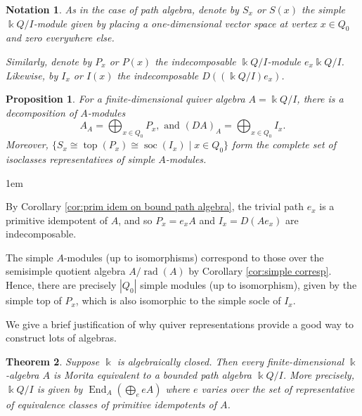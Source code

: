 \documentclass[11pt,a4paper]{article}
\makeatletter
\numberwithin{equation}{section}
\renewenvironment{proof}[1][\proofname]{\par
    \pushQED{\qed}%
    \normalfont \topsep0\p@\@plus6\p@ \labelsep1em\relax
    \trivlist
    \item[\hskip\labelsep\indent
        \bfseries #1]\ignorespaces
    \mbox{}
}{
    \popQED\endtrivlist\@endpefalse
}
\theoremstyle{all}
\newtheorem{theorem}{Theorem}[section]
\newtheorem{proposition}[theorem]{Proposition}
\newtheorem*{notation}{Notation}
\theoremstyle{remark}
\newcommand{\soc}{\operatorname{soc}\nolimits}
\newcommand{\rad}{\operatorname{rad}\nolimits}
\renewcommand{\top}{\operatorname{top}\nolimits}
\newcommand{\End}{\operatorname{End}\nolimits}
\newcommand{\defn}[1]{\textsl{\color{darkblue} #1}}
\makeatother
\begin{document}
\begin{notation}
As in the case of path algebra, denote by $S_x$ or $S(x)$ the simple $\Bbbk Q/I$-module given by placing a one-dimensional vector space at vertex $x\in Q_0$ and zero everywhere else.

Similarly, denote by $P_x$ or $P(x)$ the indecomposable $\Bbbk Q/I$-module $e_x \Bbbk Q/I$.
Likewise, by $I_x$ or $I(x)$ the indecomposable $D((\Bbbk Q/I) e_x)$.
\end{notation}

\begin{proposition}
For a finite-dimensional quiver algebra $A=\Bbbk Q/I$, there is a decomposition of $A$-modules
\[
A_A = \bigoplus_{x\in Q_0} P_x, \text{ and } (DA)_A = \bigoplus_{x\in Q_0} I_x.
\]
Moreover, $\{ S_x\cong \top(P_x) \cong \soc(I_x)\mid x\in Q_0\}$ form the complete set of isoclasses representatives of simple $A$-modules.
\end{proposition}
\begin{proof}
By Corollary \ref{cor:prim idem on bound path algebra}, the trivial path $e_x$ is a primitive idempotent of $A$, and so $P_x = e_x A$ and $I_x=D(A e_x)$ are indecomposable.

The simple $A$-modules (up to isomorphisms) correspond to those over the semisimple quotient algebra $A/\rad(A)$ by Corollary \ref{cor:simple corresp}.  Hence, there are precisely $|Q_0|$ simple modules (up to isomorphism), given by the simple top of $P_x$, which is also isomorphic to the simple socle of $I_x$.
\end{proof}

We give a brief justification of why quiver representations provide a good way to construct lots of algebras.

\begin{theorem}
Suppose $\Bbbk$ is algebraically closed.
Then every finite-dimensional $\Bbbk$-algebra $A$ is \defn{Morita equivalent} to a bounded path algebra $\Bbbk Q/I$.
More precisely, $\Bbbk Q/I$ is given by $\End_A(\bigoplus_{e} eA)$ where $e$ varies over the set of representative of equivalence classes of primitive idempotents of $A$.
\end{theorem}
\end{document}
